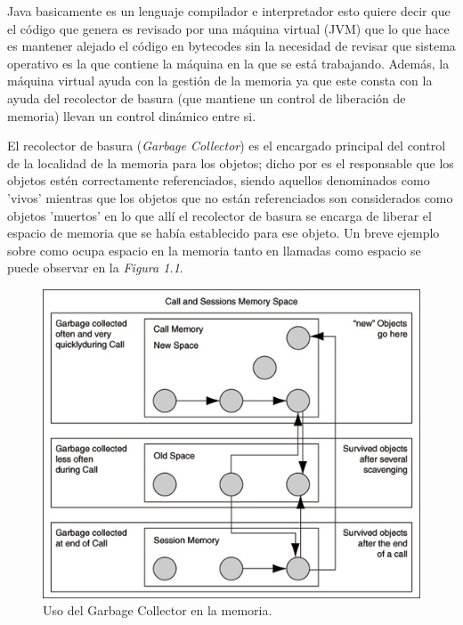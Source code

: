 \documentclass[12pt]{book} %
\begin{document}
Java basicamente es un lenguaje compilador e interpretador \cite{ob} esto quiere decir que el c\'odigo que genera es revisado por una m\'aquina virtual (JVM) que lo que hace es mantener alejado el c\'odigo en bytecodes sin la necesidad de revisar que sistema operativo es la que contiene la m\'aquina en la que se est\'a trabajando. Adem\'as, la m\'aquina virtual ayuda con la gesti\'on de la memoria ya que este consta con la ayuda del recolector de basura (que mantiene un control de liberaci\'on de memoria) llevan un control din\'amico entre si.

El recolector de basura (\textsl{Garbage Collector}) es el encargado principal del control de la localidad de la memoria para los objetos; dicho por \cite{sun} es el responsable que los objetos est\'en correctamente referenciados, siendo aquellos denominados como 'vivos' mientras que los objetos que no est\'an referenciados son considerados como objetos 'muertos' en lo que all\'i el recolector de basura se encarga de liberar el espacio de memoria que se hab\'ia establecido para ese objeto. Un breve ejemplo sobre como ocupa espacio en la memoria tanto en llamadas como espacio se puede observar en la \textsl{Figura 1.1}.

\begin{figure}[h!]
	\begin{center}
	\includegraphics[scale=0.5]{garbage.jpg}
	\end{center}
	\caption{Uso del Garbage Collector en la memoria.}
\end{figure}~\\[2cm]
\end{document}
